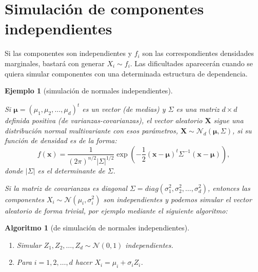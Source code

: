 \documentclass[
  10pt,
]{book}
\renewcommand{\boldsymbol}[1]{\symbf{#1}}
\renewcommand{\mathbf}[1]{\symbf{#1}}
\theoremstyle{break}
\newtheorem{conjecture}{Algoritmo}[chapter]
\newtheorem{example}{Ejemplo}[chapter]
\theoremstyle{nonumberplain}
\begin{document}
\hypertarget{simulaciuxf3n-de-componentes-independientes}{%
\section{Simulación de componentes independientes}\label{simulaciuxf3n-de-componentes-independientes}}

Si las componentes son independientes y \(f_i\) son las correspondientes densidades marginales, bastará con generar \(X_i \sim f_i\).
Las dificultades aparecerán cuando se quiera simular componentes con una determinada estructura de dependencia.

\begin{example}[simulación de normales independientes]
\protect\hypertarget{exm:normind}{}\label{exm:normind}

Si \(\boldsymbol{\mu} = \left( \mu_1, \mu_2, \ldots, \mu_d \right)^t\) es un vector (de medias) y \(\Sigma\) es una matriz \(d \times d\) definida positiva (de varianzas-covarianzas), el vector aleatorio \(\mathbf{X}\) sigue una distribución normal multivariante con esos parámetros,
\(\mathbf{X} \sim \mathcal{N}_d\left( \boldsymbol{\mu},\Sigma \right)\),
si su función de densidad es de la forma:
\[f(\mathbf x) = \frac{1}{(2\pi)^{n/2}|\Sigma|^{1/2}}
\exp \left( -\frac{1}{2} ( \mathbf x - \boldsymbol \mu)^t \Sigma^{-1} (\mathbf x - \boldsymbol \mu)
\right),\]
donde \(| \Sigma |\) es el determinante de \(\Sigma\).

Si la matriz de covarianzas es diagonal \(\Sigma=diag\left( \sigma_1^2,\sigma_2^2,\ldots,\sigma_d^2\right)\),
entonces las componentes \(X_i \sim \mathcal{N}\left( \mu_i,\sigma_i^2\right)\)
son independientes y podemos simular el vector aleatorio de forma trivial, por ejemplo mediante el siguiente algoritmo:
\end{example}

\begin{conjecture}[de simulación de normales independientes]
\protect\hypertarget{cnj:mnorm-indep}{}\label{cnj:mnorm-indep}

\begin{enumerate}
\def\labelenumi{\arabic{enumi}.}
\item
  Simular \(Z_1, Z_2, \ldots, Z_d \sim \mathcal{N} \left( 0, 1 \right)\) independientes.
\item
  Para \(i = 1, 2, \ldots, d\) hacer \(X_i = \mu_i + \sigma_i Z_i\).
\end{enumerate}

\end{conjecture}
\end{document}
